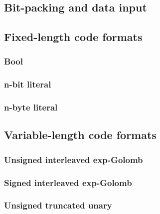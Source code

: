 

\subsection{Bit-packing and data input}
\subsection{Fixed-length code formats}
\subsubsection{Bool}
\subsubsection{n-bit literal}
\subsubsection{n-byte literal}
\subsection{Variable-length code formats}
\subsubsection{Unsigned interleaved exp-Golomb}
\subsubsection{Signed interleaved exp-Golomb}
\subsubsection{Unsigned truncated unary}

